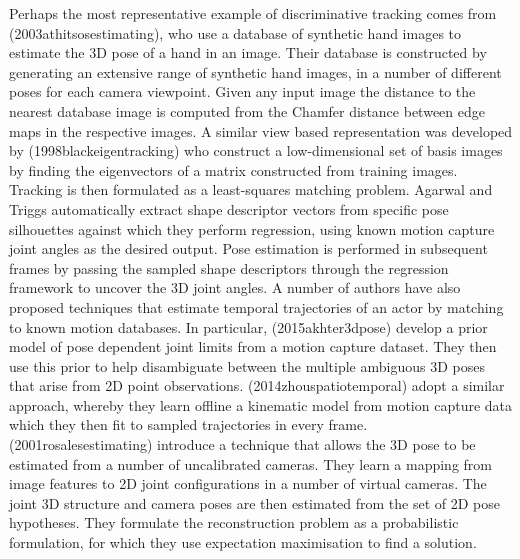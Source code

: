 Perhaps the most representative example of discriminative tracking comes from (2003athitsosestimating), who use a database of synthetic hand images to estimate the 3D pose of a hand in an image. Their database is constructed by generating an extensive range of synthetic hand images, in a number of different poses for each camera viewpoint. Given any input image the distance to the nearest database image is computed from the Chamfer distance between edge maps in the respective images. A similar view based representation was developed by (1998blackeigentracking) who construct a low-dimensional set of basis images by finding the eigenvectors of a matrix constructed from training images. Tracking is then formulated as a least-squares matching problem. Agarwal and Triggs automatically extract shape descriptor vectors from specific pose silhouettes against which they perform regression, using known motion capture joint angles as the desired output. Pose estimation is performed in subsequent frames by passing the sampled shape descriptors through the regression framework to uncover the 3D joint angles. A number of authors have also proposed techniques that estimate temporal trajectories of an actor by matching to known motion databases. In particular, (2015akhter3dpose) develop a prior model of pose dependent joint limits from a motion capture dataset. They then use this prior to help disambiguate between the multiple ambiguous 3D poses that arise from 2D point observations. (2014zhouspatiotemporal) adopt a similar approach, whereby they learn offline a kinematic model from motion capture data which they then fit to sampled trajectories in every frame. (2001rosalesestimating) introduce a technique that allows the 3D pose to be estimated from a number of uncalibrated cameras. They learn a mapping from image features to 2D joint configurations in a number of virtual cameras. The joint 3D structure and camera poses are then estimated from the set of 2D pose hypotheses. They formulate the reconstruction problem as a probabilistic formulation, for which they use expectation maximisation to find a solution.

